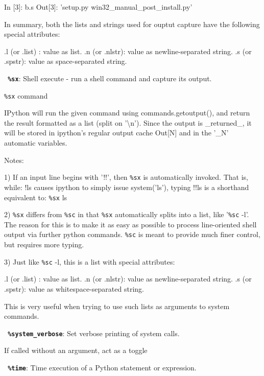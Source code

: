             In [3]: b.s
            Out[3]: 'setup.py win32\_manual\_post\_install.py'

        In summary, both the lists and strings used for ouptut capture have
        the following special attributes:

            .l (or .list) : value as list.
            .n (or .nlstr): value as newline-separated string.
            .s (or .spstr): value as space-separated string.
        

\bigskip
\texttt{\textbf{ \%sx}}:
	Shell execute - run a shell command and capture its output.

        \texttt{\%sx} command

        IPython will run the given command using commands.getoutput(), and
        return the result formatted as a list (split on '\textbackslash{}n').  Since the
        output is \_returned\_, it will be stored in ipython's regular output
        cache Out[N] and in the '\_N' automatic variables.

        Notes:

        1) If an input line begins with '!!', then \texttt{\%sx} is automatically
        invoked.  That is, while:
          !ls
        causes ipython to simply issue system('ls'), typing
          !!ls
        is a shorthand equivalent to:
          \texttt{\%sx} ls
        
        2) \texttt{\%sx} differs from \texttt{\%sc} in that \texttt{\%sx} automatically splits into a list,
        like '\texttt{\%sc} -l'.  The reason for this is to make it as easy as possible
        to process line-oriented shell output via further python commands.
        \texttt{\%sc} is meant to provide much finer control, but requires more
        typing.

        3) Just like \texttt{\%sc} -l, this is a list with special attributes:

          .l (or .list) : value as list.
          .n (or .nlstr): value as newline-separated string.
          .s (or .spstr): value as whitespace-separated string.

        This is very useful when trying to use such lists as arguments to
        system commands.

\bigskip
\texttt{\textbf{ \%system\_verbose}}:
	Set verbose printing of system calls.

        If called without an argument, act as a toggle

\bigskip
\texttt{\textbf{ \%time}}:
	Time execution of a Python statement or expression.

